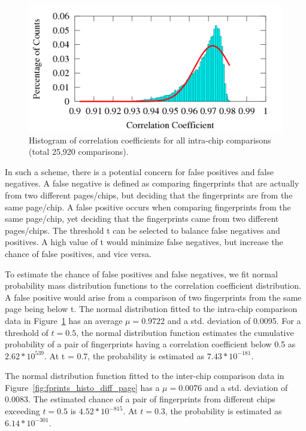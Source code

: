 \begin{figure}
\begin{center} 
\includegraphics[width=\mywidth]{figs/fprints_histo_same_page.png} 
\caption{Histogram of correlation coefficients for all intra-chip comparisons (total 25,920 comparisons).}
\label{fig:fprints_histo_same_page} 
\vspace{-0.1in}
\end{center} 
\end{figure} 

In such a scheme, there is a potential concern for false positives and false negatives. A false negative is defined as comparing fingerprints that are actually from two different pages/chips, but deciding that the fingerprints are from the same page/chip. A false positive occurs when comparing fingerprints from the same page/chip, yet deciding that the fingerprints came from two different pages/chips. The threshold t can be selected to balance false negatives and positives. A high value of t would minimize false negatives, but increase the chance of false positives, and vice versa.

To estimate the chance of false positives and false negatives, we fit normal probability mass distribution functions to the correlation coefficient distribution. A false positive would arise from a comparison of two fingerprints from the same page being below t. The normal distribution fitted to the intra-chip comparison data in Figure~\ref{fig:fprints_histo_same_page} has an average $\mu = 0.9722$ and a std. deviation of 0.0095. For a threshold of $t = 0.5$, the normal distribution function estimates the cumulative probability of a pair of fingerprints having a correlation coefficient below 0.5 as $2.62*10^{539}$. At t = 0.7, the probability is estimated as $7.43*10^{-181}$.

The normal distribution function fitted to the inter-chip comparison data in Figure~\ref{fig:fprints_histo_diff_page} has a $\mu = 0.0076$ and a std. deviation of 0.0083. The estimated chance of a pair of fingerprints from different chips exceeding $t = 0.5$ is $4.52*10^{-815}$. At $t = 0.3$, the probability is estimated as $6.14*10^{-301}$.

